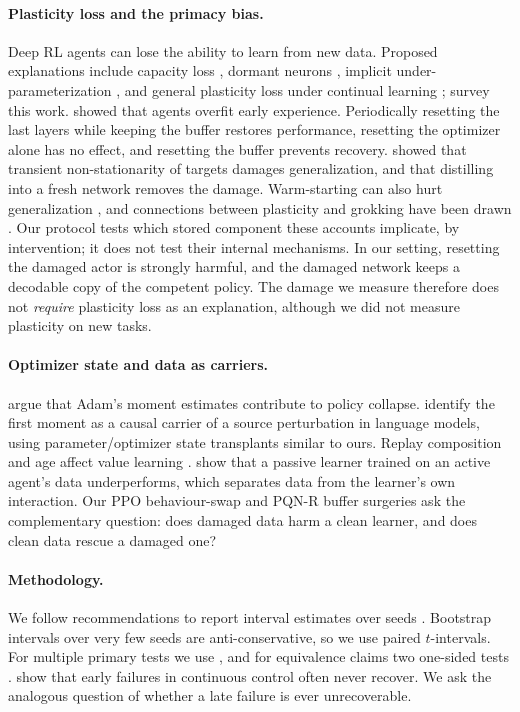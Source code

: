 \documentclass[10pt]{article} %
\begin{document}
\paragraph{Plasticity loss and the primacy bias.}
Deep RL agents can lose the ability to learn from new data. Proposed explanations include capacity loss \citep{lyle2022capacity}, dormant neurons \citep{sokar2023dormant,xu2024drm}, implicit under-parameterization \citep{kumar2021implicit}, and general plasticity loss under continual learning \citep{lyle2023plasticity,dohare2024loss,juliani2024onpolicy}; \citet{klein2024survey} survey this work. \citet{nikishin2022primacy} showed that agents overfit early experience. Periodically resetting the last layers while keeping the buffer restores performance, resetting the optimizer alone has no effect, and resetting the buffer prevents recovery. \citet{igl2021transient} showed that transient non-stationarity of targets damages generalization, and that distilling into a fresh network removes the damage. Warm-starting can also hurt generalization \citep{ash2020warm}, and connections between plasticity and grokking have been drawn \citep{lyle2025grokking}. Our protocol tests which stored component these accounts implicate, by intervention; it does not test their internal mechanisms. In our setting, resetting the damaged actor is strongly harmful, and the damaged network keeps a decodable copy of the competent policy. The damage we measure therefore does not \emph{require} plasticity loss as an explanation, although we did not measure plasticity on new tasks.

\paragraph{Optimizer state and data as carriers.}
\citet{dohare2023collapse} argue that Adam's moment estimates contribute to policy collapse. \citet{xu2026optimizer} identify the first moment as a causal carrier of a source perturbation in language models, using parameter/optimizer state transplants similar to ours. Replay composition and age affect value learning \citep{fedus2020replay}. \citet{ostrovski2021passive} show that a passive learner trained on an active agent's data underperforms, which separates data from the learner's own interaction. Our PPO behaviour-swap and PQN-R buffer surgeries ask the complementary question: does damaged data harm a clean learner, and does clean data rescue a damaged one?

\paragraph{Methodology.}
We follow recommendations to report interval estimates over seeds \citep{henderson2018matters,agarwal2021precipice}. Bootstrap intervals over very few seeds are anti-conservative, so we use paired $t$-intervals. For multiple primary tests we use \citet{holm1979simple}, and for equivalence claims two one-sided tests \citep[TOST;][]{lakens2017equivalence}. \citet{bjorck2022variance} show that early failures in continuous control often never recover. We ask the analogous question of whether a late failure is ever unrecoverable.
\end{document}
